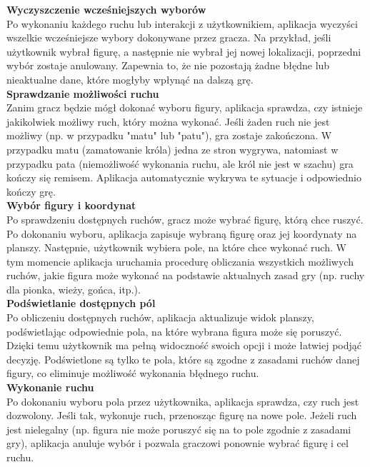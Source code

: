 \documentclass[12pt,a4paper]{article}
\begin{document}
\textbf{Wyczyszczenie wcześniejszych wyborów}\\
Po wykonaniu każdego ruchu lub interakcji z użytkownikiem, aplikacja wyczyści wszelkie wcześniejsze wybory dokonywane przez gracza. Na przykład, jeśli użytkownik wybrał figurę, a następnie nie wybrał jej nowej lokalizacji, poprzedni wybór zostaje anulowany. Zapewnia to, że nie pozostają żadne błędne lub nieaktualne dane, które mogłyby wpłynąć na dalszą grę.
\\

\textbf{Sprawdzanie możliwości ruchu}\\
Zanim gracz będzie mógł dokonać wyboru figury, aplikacja sprawdza, czy istnieje jakikolwiek możliwy ruch, który można wykonać. Jeśli żaden ruch nie jest możliwy (np. w przypadku "matu" lub "patu"), gra zostaje zakończona. W przypadku matu (zamatowanie króla) jedna ze stron wygrywa, natomiast w przypadku pata (niemożliwość wykonania ruchu, ale król nie jest w szachu) gra kończy się remisem. Aplikacja automatycznie wykrywa te sytuacje i odpowiednio kończy grę.
\\

\textbf{Wybór figury i koordynat}\\
Po sprawdzeniu dostępnych ruchów, gracz może wybrać figurę, którą chce ruszyć. Po dokonaniu wyboru, aplikacja zapisuje wybraną figurę oraz jej koordynaty na planszy. Następnie, użytkownik wybiera pole, na które chce wykonać ruch. W tym momencie aplikacja uruchamia procedurę obliczania wszystkich możliwych ruchów, jakie figura może wykonać na podstawie aktualnych zasad gry (np. ruchy dla pionka, wieży, gońca, itp.).
\\

\textbf{Podświetlanie dostępnych pól}\\
Po obliczeniu dostępnych ruchów, aplikacja aktualizuje widok planszy, podświetlając odpowiednie pola, na które wybrana figura może się poruszyć. Dzięki temu użytkownik ma pełną widoczność swoich opcji i może łatwiej podjąć decyzję. Podświetlone są tylko te pola, które są zgodne z zasadami ruchów danej figury, co eliminuje możliwość wykonania błędnego ruchu.
\\

\textbf{Wykonanie ruchu}\\
Po dokonaniu wyboru pola przez użytkownika, aplikacja sprawdza, czy ruch jest dozwolony. Jeśli tak, wykonuje ruch, przenosząc figurę na nowe pole. Jeżeli ruch jest nielegalny (np. figura nie może poruszyć się na to pole zgodnie z zasadami gry), aplikacja anuluje wybór i pozwala graczowi ponownie wybrać figurę i cel ruchu.
\\
\end{document}
